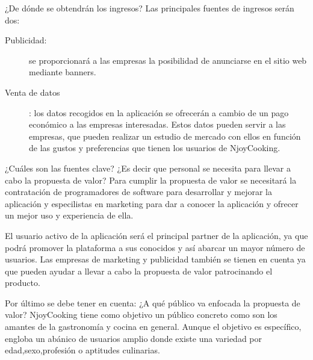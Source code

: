\vspace{5 mm}

¿De dónde se obtendrán los ingresos? Las principales fuentes de ingresos serán dos:

\begin{description}

\item [Publicidad:] se proporcionará a las empresas la posibilidad de anunciarse en el sitio web mediante banners.

\item [Venta de datos]: los datos recogidos en la aplicación se ofrecerán a cambio de un pago económico a las empresas interesadas. Estos datos pueden servir a las empresas, que pueden realizar un estudio de mercado con ellos en función de las gustos y preferencias que tienen los usuarios de NjoyCooking.

\end{description}

\vspace{5 mm}

¿Cuáles son las fuentes clave? ¿Es decir que personal se necesita para llevar a cabo la propuesta de valor? Para cumplir la propuesta de valor se necesitará la contratación de programadores de software para desarrollar y mejorar la aplicación y especilistas en marketing para dar a conocer la aplicación y ofrecer un mejor uso y experiencia de ella.

\vspace{5 mm}

El usuario activo de la aplicación será el principal partner de la aplicación, ya que podrá promover la plataforma a sus conocidos y así abarcar un mayor número de usuarios. Las empresas de marketing y publicidad también se tienen en cuenta ya que pueden ayudar a llevar a cabo la propuesta de valor patrocinando el producto.


\vspace{5 mm}

Por último se debe tener en cuenta: ¿A qué público va enfocada la propuesta de valor? NjoyCooking tiene como objetivo un público concreto como son los amantes de la gastronomía y cocina en general. Aunque el objetivo es específico, engloba un abánico de usuarios amplio donde existe una variedad por edad,sexo,profesión o aptitudes culinarias.
